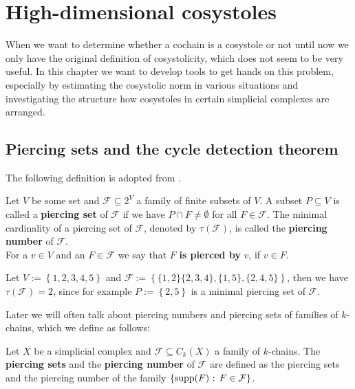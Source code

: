
\chapter{High-dimensional cosystoles}

\label{Chapter2}

When we want to determine whether a cochain is a cosystole or not until now we only have the original definition of cosystolicity, which does not seem to be very useful. In this chapter we want to develop tools to get hands on this problem, especially by estimating the cosystolic norm in various situations and investigating the structure how cosystoles in certain simplicial complexes are arranged.

\section{Piercing sets and the cycle detection theorem}

The following definition is adopted from \cite{6}.

\begin{defi}
Let \(V\) be some set and \(\mathcal{F}\subseteq 2^V\) a family of finite subsets of \(V\). A subset \(P\subseteq V\) is called a \textbf{piercing set} of \(\mathcal{F}\) if we have \(P\cap F\neq\emptyset\) for all \(F\in\mathcal{F}\). The minimal cardinality of a piercing set of \(\mathcal{F}\), denoted by \(\tau(\mathcal{F})\), is called the \textbf{piercing number} of \(\mathcal{F}\).\\
For a \(v\in V\) and an \(F\in\mathcal{F}\) we say that \(F\) \textbf{is pierced by} \(v\), if \(v\in F\).
\end{defi}

\begin{expl}\label{example1}
Let \(V:=\left\{1,2,3,4,5\right\}\) and \(\mathcal{F}:=\left\{\{1,2\}\{2,3,4\},\{1,5\},\{2,4,5\}\right\}\), then we have \(\tau(\mathcal{F})=2\), since for example \(P:=\left\{2,5\right\}\) is a minimal piercing set of \(\mathcal{F}\).
\end{expl}

Later we will often talk about piercing numbers and piercing sets of families of \(k\)-chains, which we define as follows:

\begin{defi}
Let \(X\) be a simplicial complex and \(\mathcal{F}\subseteq C_k(X)\) a family of \(k\)-chains. The \textbf{piercing sets} and the \textbf{piercing number} of \(\mathcal{F}\) are defined as the piercing sets and the piercing number of the family \(\left\{\mathrm{supp}(F)\text{ : }F\in\mathcal{F}\right\}\).
\end{defi}

